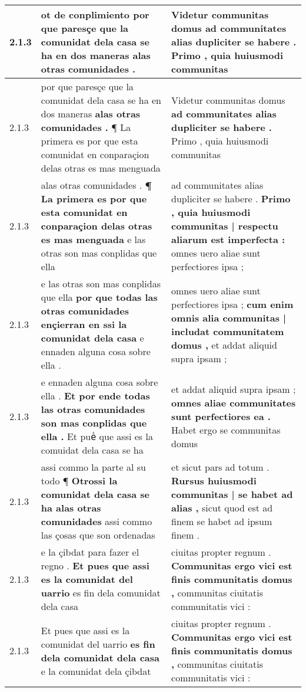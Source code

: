 \begin{tabular}{|p{1cm}|p{6.5cm}|p{6.5cm}|}
2.1.3 & ot de conplimiento \textbf{ por que paresçe que la comunidat dela casa se ha en dos maneras } alas otras comunidades . & Videtur communitas domus \textbf{ ad communitates alias dupliciter se habere . } Primo , quia huiusmodi communitas \\\hline
2.1.3 & por que paresçe que la comunidat dela casa se ha en dos maneras \textbf{ alas otras comunidades . } ¶ La primera es por que esta comunidat en conparaçion delas otras es mas menguada & Videtur communitas domus \textbf{ ad communitates alias dupliciter se habere . } Primo , quia huiusmodi communitas \\\hline
2.1.3 & alas otras comunidades . \textbf{ ¶ La primera es por que esta comunidat en conparaçion delas otras es mas menguada } e las otras son mas conplidas que ella & ad communitates alias dupliciter se habere . \textbf{ Primo , quia huiusmodi communitas | respectu aliarum est imperfecta : } omnes uero aliae sunt perfectiores ipsa ; \\\hline
2.1.3 & e las otras son mas conplidas que ella \textbf{ por que todas las otras comunidades ençierran en ssi la comunidat dela casa } e ennaden alguna cosa sobre ella . & omnes uero aliae sunt perfectiores ipsa ; \textbf{ cum enim omnis alia communitas | includat communitatem domus , } et addat aliquid supra ipsam ; \\\hline
2.1.3 & e ennaden alguna cosa sobre ella . \textbf{ Et por ende todas las otras comunidades son mas conplidas que ella . } Et pueᷤ que assi es la comuidat dela casa se ha & et addat aliquid supra ipsam ; \textbf{ omnes aliae communitates sunt perfectiores ea . } Habet ergo se communitas domus \\\hline
2.1.3 & assi commo la parte al su todo ¶ \textbf{ Otrossi la comunidat dela casa se ha alas otras comunidades } assi commo las çosas que son ordenadas & et sicut pars ad totum . \textbf{ Rursus huiusmodi communitas | se habet ad alias , } sicut quod est ad finem se habet ad ipsum finem . \\\hline
2.1.3 & e la çibdat para fazer el regno . \textbf{ Et pues que assi es la comunidat del uarrio } es fin dela comunidat dela casa & ciuitas propter regnum . \textbf{ Communitas ergo vici est finis communitatis domus , } communitas ciuitatis communitatis vici : \\\hline
2.1.3 & Et pues que assi es la comunidat del uarrio \textbf{ es fin dela comunidat dela casa } e la comunidat dela çibdat & ciuitas propter regnum . \textbf{ Communitas ergo vici est finis communitatis domus , } communitas ciuitatis communitatis vici : \\\hline

\end{tabular}
